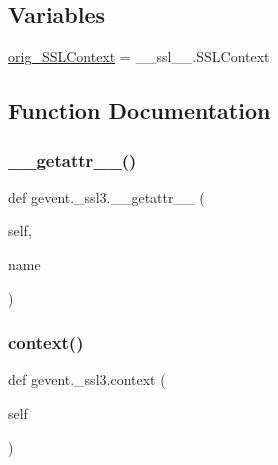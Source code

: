 \subsection*{Variables}
\begin{DoxyCompactItemize}
\item 
\hyperlink{namespacegevent_1_1__ssl3_a69071f879ef0476c5b0219f1d07ebf5c}{orig\+\_\+\+S\+S\+L\+Context} = \+\_\+\+\_\+ssl\+\_\+\+\_\+.\+S\+S\+L\+Context
\end{DoxyCompactItemize}


\subsection{Function Documentation}
\mbox{\label{namespacegevent_1_1__ssl3_a4981cd66ced9a108f4369b8f23264d9e}} 
\subsubsection{\texorpdfstring{\+\_\+\+\_\+getattr\+\_\+\+\_\+()}{\_\_getattr\_\_()}}
{\footnotesize\ttfamily def gevent.\+\_\+ssl3.\+\_\+\+\_\+getattr\+\_\+\+\_\+ (\begin{DoxyParamCaption}\item[{}]{self,  }\item[{}]{name }\end{DoxyParamCaption})}

\mbox{\label{namespacegevent_1_1__ssl3_add9cd88d182d4133bb7c0b2d44ece79d}} 
\subsubsection{\texorpdfstring{context()}{context()}\hspace{0.1cm}{\footnotesize\ttfamily [1/2]}}
{\footnotesize\ttfamily def gevent.\+\_\+ssl3.\+context (\begin{DoxyParamCaption}\item[{}]{self }\end{DoxyParamCaption})}

